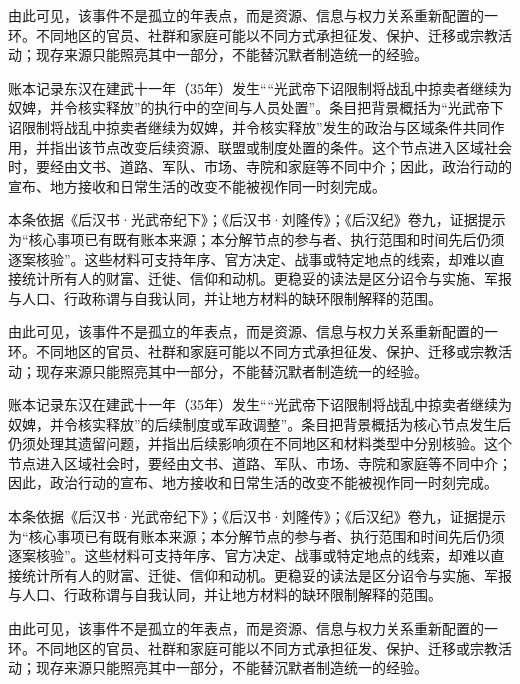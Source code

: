 由此可见，该事件不是孤立的年表点，而是资源、信息与权力关系重新配置的一环。不同地区的官员、社群和家庭可能以不同方式承担征发、保护、迁移或宗教活动；现存来源只能照亮其中一部分，不能替沉默者制造统一的经验。

账本记录东汉在建武十一年（35年）发生““光武帝下诏限制将战乱中掠卖者继续为奴婢，并令核实释放”的执行中的空间与人员处置”。条目把背景概括为“光武帝下诏限制将战乱中掠卖者继续为奴婢，并令核实释放”发生的政治与区域条件共同作用，并指出该节点改变后续资源、联盟或制度处置的条件。这个节点进入区域社会时，要经由文书、道路、军队、市场、寺院和家庭等不同中介；因此，政治行动的宣布、地方接收和日常生活的改变不能被视作同一时刻完成。

本条依据《后汉书·光武帝纪下》；《后汉书·刘隆传》；《后汉纪》卷九，证据提示为“核心事项已有既有账本来源；本分解节点的参与者、执行范围和时间先后仍须逐案核验”。这些材料可支持年序、官方决定、战事或特定地点的线索，却难以直接统计所有人的财富、迁徙、信仰和动机。更稳妥的读法是区分诏令与实施、军报与人口、行政称谓与自我认同，并让地方材料的缺环限制解释的范围。

由此可见，该事件不是孤立的年表点，而是资源、信息与权力关系重新配置的一环。不同地区的官员、社群和家庭可能以不同方式承担征发、保护、迁移或宗教活动；现存来源只能照亮其中一部分，不能替沉默者制造统一的经验。

账本记录东汉在建武十一年（35年）发生““光武帝下诏限制将战乱中掠卖者继续为奴婢，并令核实释放”的后续制度或军政调整”。条目把背景概括为核心节点发生后仍须处理其遗留问题，并指出后续影响须在不同地区和材料类型中分别核验。这个节点进入区域社会时，要经由文书、道路、军队、市场、寺院和家庭等不同中介；因此，政治行动的宣布、地方接收和日常生活的改变不能被视作同一时刻完成。

本条依据《后汉书·光武帝纪下》；《后汉书·刘隆传》；《后汉纪》卷九，证据提示为“核心事项已有既有账本来源；本分解节点的参与者、执行范围和时间先后仍须逐案核验”。这些材料可支持年序、官方决定、战事或特定地点的线索，却难以直接统计所有人的财富、迁徙、信仰和动机。更稳妥的读法是区分诏令与实施、军报与人口、行政称谓与自我认同，并让地方材料的缺环限制解释的范围。

由此可见，该事件不是孤立的年表点，而是资源、信息与权力关系重新配置的一环。不同地区的官员、社群和家庭可能以不同方式承担征发、保护、迁移或宗教活动；现存来源只能照亮其中一部分，不能替沉默者制造统一的经验。
